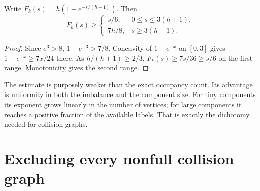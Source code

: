 \documentclass[11pt,a4paper]{article}
\numberwithin{equation}{section}
\theoremstyle{definition}
\theoremstyle{remark}
\begin{document}
\begin{corollary}\label{nl:cor:occupancyranges}
Write $F_k(s)=h(1-e^{-s/(h+1)})$. Then
\begin{equation}\label{nl:eq:Franges}
 F_k(s)\ge
 \begin{cases}s/6,&0\le s\le3(h+1),\\7h/8,&s\ge3(h+1).
 \end{cases}
\end{equation}
\end{corollary}
\begin{proof}
Since $e^3>8$, $1-e^{-3}>7/8$.
Concavity of $1-e^{-x}$ on $[0,3]$ gives
$1-e^{-x}\ge7x/24$ there. As $h/(h+1)\ge2/3$,
$F_k(s)\ge7s/36\ge s/6$ on the first range.
Monotonicity gives the second range.
\end{proof}

The estimate is purposely weaker than the exact occupancy count. Its
advantage is uniformity in both the imbalance and the component size.
For tiny components its exponent grows linearly in the number of vertices;
for large components it reaches a positive fraction of the available labels.
That is exactly the dichotomy needed for collision graphs.

\section{Excluding every nonfull collision graph}\label{nl:sec:separation}
\end{document}
